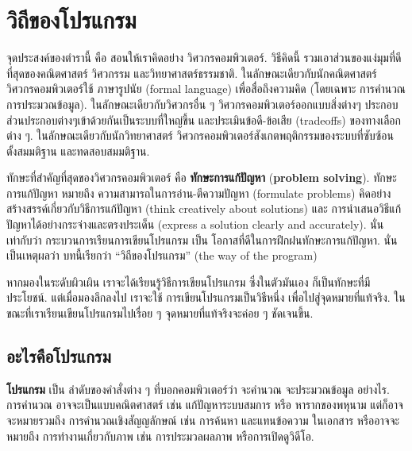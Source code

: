 \normalsize
\clearemptydoublepage

\begin{latexonly}

\tableofcontents

\clearemptydoublepage

\end{latexonly}

\mainmatter

\chapter{วิถีของโปรแกรม}%

จุดประสงค์ของตำรานี้ คือ สอนให้เราคิดอย่าง%
วิศวกรคอมพิวเตอร์. 
วิธีคิดนี้ รวมเอาส่วนของแง่มุมที่ดีที่สุดของคณิตศาสตร์ วิศวกรรม และวิทยาศาสตร์ธรรมชาติ. ในลักษณะเดียวกับนักคณิตศาสตร์ วิศวกรคอมพิวเตอร์ใช้ ภาษารูปนัย (formal language) เพื่อสื่อถึงความคิด (โดยเฉพาะ การคำนวณ การประมวณข้อมูล). ในลักษณะเดียวกับวิศวกรอื่น ๆ วิศวกรคอมพิวเตอร์ออกแบบสิ่งต่างๆ ประกอบส่วนประกอบต่างๆเข้าด้วยกันเป็นระบบที่ใหญ่ขึ้น และประเมินข้อดี-ข้อเสีย (tradeoffs) ของทางเลือกต่าง ๆ. ในลักษณะเดียวกับนักวิทยาศาสตร์ วิศวกรคอมพิวเตอร์สังเกตพฤติกรรมของระบบที่ซับซ้อน ตั้งสมมติฐาน และทดสอบสมมติฐาน.

ทักษะที่สำคัญที่สุดของวิศวกรคอมพิวเตอร์ คือ {\bf ทักษะการแก้ปัญหา} (\textbf{problem solving}). ทักษะการแก้ปัญหา หมายถึง ความสามารถในการอ่าน-ตีความปัญหา (formulate problems) คิดอย่างสร้างสรรค์เกี่ยวกับวิธีการแก้ปัญหา (think creatively about solutions) และ การนำเสนอวิธีแก้ปัญหาได้อย่างกระจ่างและตรงประเด็น (express a solution clearly and accurately). 
%
นั่นเท่ากับว่า กระบวนการเรียนการเขียนโปรแกรม เป็น โอกาสที่ดีในการฝึกฝนทักษะการแก้ปัญหา. นั่นเป็นเหตุผลว่า บทนี้เรียกว่า ``วิถีของโปรแกรม'' (the way of the program)

หากมองในระดับผิวเผิน เราจะได้เรียนรู้วิธีการเขียนโปรแกรม ซึ่งในตัวมันเอง ก็เป็นทักษะที่มีประโยชน์. แต่เมื่อมองลึกลงไป เราจะใช้ การเขียนโปรแกรมเป็นวิธีหนึ่ง เพื่อไปสู่จุดหมายที่แท้จริง. ในขณะที่เราเรียนเขียนโปรแกรมไปเรื่อย ๆ จุดหมายที่แท้จริงจะค่อย ๆ ชัดเจนขึ้น.  

\section{อะไรคือโปรแกรม}

\textbf{โปรแกรม} เป็น ลำดับของคำสั่งต่าง ๆ ที่บอกคอมพิวเตอร์ว่า จะคำนวณ จะประมวณข้อมูล อย่างไร.
การคำนวณ อาจจะเป็นแบบคณิตศาสตร์ เช่น แก้ปัญหาระบบสมการ หรือ หารากของพหุนาม 
แต่ก็อาจจะหมายรวมถึง การคำนวณเชิงสัญญลักษณ์ เช่น การค้นหา และแทนข้อความ ในเอกสาร หรืออาจจะหมายถึง การทำงานเกี่ยวกับภาพ เช่น การประมวลผลภาพ หรือการเปิดดูวิดีโอ.

